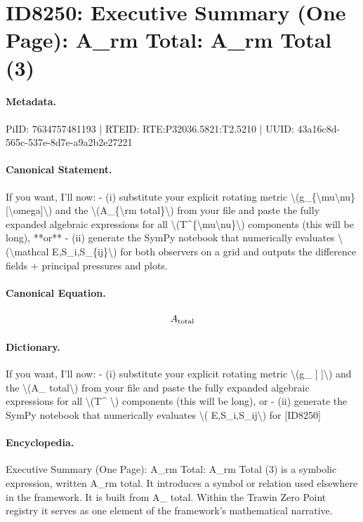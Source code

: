 \section*{ID8250: Executive Summary (One Page): A\_rm Total: A\_rm Total (3)}
\paragraph{Metadata.}
PiID: 7634757481193 | RTEID: RTE:P32036.5821:T2.5210 | UUID: 43a16c8d-565c-537e-8d7e-a9a2b2e27221

\paragraph{Canonical Statement.}
If you want, I’ll now: - (i) substitute your explicit rotating metric \textbackslash{}(g\_\{\textbackslash{}mu\textbackslash{}nu\}[\textbackslash{}omega]\textbackslash{}) and the \textbackslash{}(A\_\{\textbackslash{}rm total\}\textbackslash{}) from your file and paste the fully expanded algebraic expressions for all \textbackslash{}(T\textasciicircum{}\{\textbackslash{}mu\textbackslash{}nu\}\textbackslash{}) components (this will be long), **or** - (ii) generate the SymPy notebook that numerically evaluates \textbackslash{}(\textbackslash{}mathcal E,S\_i,S\_\{ij\}\textbackslash{}) for both observers on a grid and outputs the difference fields + principal pressures and plots.

\paragraph{Canonical Equation.}
\[
A_{\rm total}
\]

\paragraph{Dictionary.}
If you want, I’ll now: - (i) substitute your explicit rotating metric \textbackslash{}(g\_ [ ]\textbackslash{}) and the \textbackslash{}(A\_ total\textbackslash{}) from your file and paste the fully expanded algebraic expressions for all \textbackslash{}(T\textasciicircum{} \textbackslash{}) components (this will be long), or - (ii) generate the SymPy notebook that numerically evaluates \textbackslash{}( E,S\_i,S\_ij\textbackslash{}) for [ID8250]

\paragraph{Encyclopedia.}
Executive Summary (One Page): A\_rm Total: A\_rm Total (3) is a symbolic expression, written A\_rm total. It introduces a symbol or relation used elsewhere in the framework. It is built from A\_ total. Within the Trawin Zero Point registry it serves as one element of the framework's mathematical narrative.

